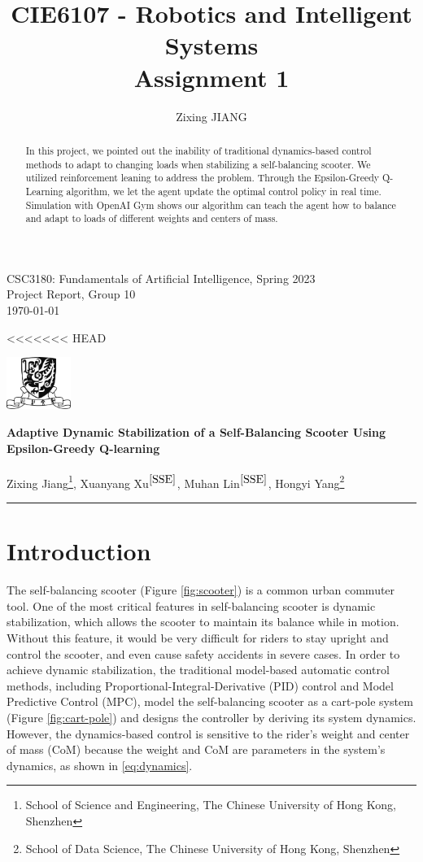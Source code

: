 \documentclass[10pt,a4paper]{article}
\title{\textbf{CIE6107 - Robotics and Intelligent Systems \\Assignment 1}}
\author{Zixing JIANG}
\begin{document}
	
	\begin{flushleft}
		CSC3180: Fundamentals of Artificial Intelligence, Spring 2023\\
		Project Report, Group 10\\
		\today
	\end{flushleft}
	
<<<<<<< HEAD
	\begin{flushright}\vspace{-22mm}
		\includegraphics[height=1.7cm]{figure/logo.png}
	\end{flushright}
	
	\begin{center}\vspace{0.2cm}
		\textbf{\Large Adaptive Dynamic Stabilization of a Self-Balancing Scooter Using Epsilon-Greedy Q-learning}\\~\\
		\large Zixing Jiang\footnote{School of Science and Engineering, The Chinese University of Hong Kong, Shenzhen\label{SSE}}, Xuanyang Xu$^{\ref{SSE}}$, Muhan Lin$^{\ref{SSE}}$, Hongyi Yang\footnote{School of Data Science, The Chinese University of Hong Kong, Shenzhen}
	\end{center}
	{\noindent}\rule{\linewidth}{0.1mm}
	
	\begin{abstract}
		In this project, we pointed out the inability of traditional dynamics-based control methods to adapt to changing loads when stabilizing a self-balancing scooter. We utilized reinforcement leaning to address the problem. Through the Epsilon-Greedy Q-Learning algorithm, we let the agent update the optimal control policy in real time. Simulation with OpenAI Gym shows our algorithm can teach the agent how to balance and adapt to loads of different weights and centers of mass. 
	\end{abstract} 
	
	\section{Introduction}
	The self-balancing scooter (Figure \ref{fig:scooter}) is a common urban commuter tool. One of the most critical features in self-balancing scooter is dynamic stabilization,  which allows the scooter to maintain its balance while in motion. Without this feature, it would be very difficult for riders to stay upright and control the scooter, and even cause safety accidents in severe cases. In order to achieve dynamic stabilization, the traditional model-based automatic control methods, including Proportional-Integral-Derivative (PID) control and Model Predictive Control (MPC), model the self-balancing scooter as a cart-pole system (Figure \ref{fig:cart-pole}) and designs the controller by deriving its system dynamics. However, the dynamics-based control is sensitive to the rider's weight and center of mass (CoM) because the weight and CoM are parameters in the system's dynamics, as shown in \eqref{eq:dynamics}.
	
\end{document}
